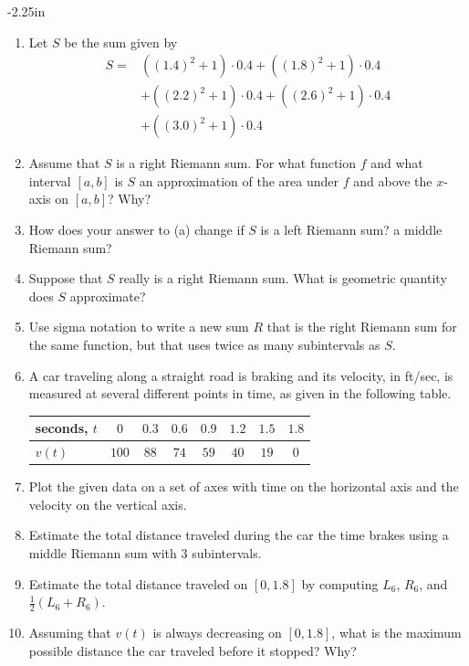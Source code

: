 \begin{adjustwidth*}{}{-2.25in}
\setlength{\columnsep}{25pt}
\begin{multicols*}{2}\small

\begin{enumerate}[1),start=39]
\item Let $S$ be the sum given by
\begin{align*}
S = & ((1.4)^2 + 1) \cdot 0.4 + ((1.8)^2 + 1) \cdot 0.4 \\
& + ((2.2)^2 + 1) \cdot 0.4 + ((2.6)^2 + 1) \cdot 0.4 \\
& +((3.0)^2 + 1) \cdot 0.4
\end{align*}
  	\ba
		\item Assume that $S$ is a right Riemann sum.  For what function $f$ and what interval $[a,b]$ is $S$ an approximation of the area under $f$ and above the $x$-axis on $[a,b]$?  Why?
		\item How does your answer to (a) change if $S$ is a left Riemann sum?  a middle Riemann sum?
		\item Suppose that $S$ really is a right Riemann sum.  What is geometric quantity does $S$ approximate?
		\item Use sigma notation to write a new sum $R$ that is the right Riemann sum for the same function, but that uses twice as many subintervals as $S$.
	\ea
	
	\item A car traveling along a straight road is braking and its velocity, in ft/sec, is measured at several different points in time, as given in the following table.
\begin{center}
\begin{tabular}{|l|c|c|c|c|c|c|c|}
\hline
seconds, $t$ & $0$ & $0.3$ & $0.6$ & $0.9$ & $1.2$ & $1.5$ & $1.8$ \\
\hline
$v(t)$ & $100$ & $88$ & $74$ & $59$ & $40$ & $19$ & $0$ \\
\hline
\end{tabular}
\end{center}
\ba
	\item Plot the given data on a set of axes with time on the horizontal axis and the velocity on the vertical axis.
	\item Estimate the total distance traveled during the car the time brakes using a middle Riemann sum with 3 subintervals.
	\item Estimate the total distance traveled on $[0,1.8]$ by computing $L_6$, $R_6$, and $\frac{1}{2}(L_6 + R_6)$.
	\item Assuming that $v(t)$ is always decreasing on $[0,1.8]$, what is the maximum possible distance the car traveled before it stopped?  Why?
\ea


\end{enumerate}
\end{multicols*}
\end{adjustwidth*}
